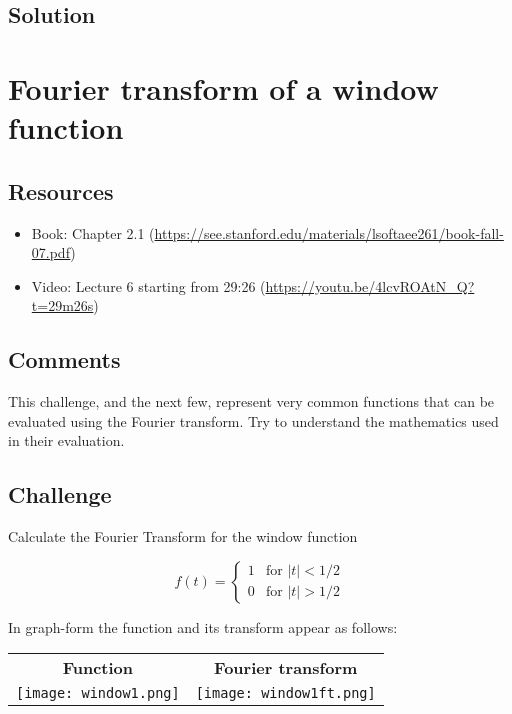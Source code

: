 \subsection*{Solution}




\newpage
\section{Fourier transform of a window function}
\label{sec:tophat}

\subsection*{Resources}
\begin{itemize}
    \item Book: Chapter 2.1 (\url{https://see.stanford.edu/materials/lsoftaee261/book-fall-07.pdf})
    \item Video: Lecture 6 starting from 29:26 (\url{https://youtu.be/4lcvROAtN_Q?t=29m26s})
\end{itemize}

\subsection*{Comments}
This challenge, and the next few, represent very common functions that can be evaluated using the Fourier transform. Try to understand the mathematics used in their evaluation.

\subsection*{Challenge}
Calculate the Fourier Transform for the window function

\begin{equation}
    f(t)=
    \begin{cases}
        1 & \text{for } |t| < 1/2 \\
        0 & \text{for } |t| > 1/2
    \end{cases}
\end{equation}

In graph-form the function and its transform appear as follows:

\begin{tabular}{cc}
    \textbf{Function} & \textbf{Fourier transform} \\
    \texttt{[image: window1.png]} & \texttt{[image: window1ft.png]}
\end{tabular}

